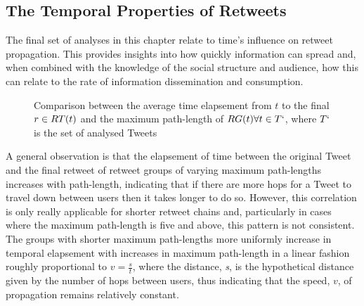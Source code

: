  
\subsection{The Temporal Properties of Retweets}
The final set of analyses in this chapter relate to time's influence on retweet propagation. This provides insights into how quickly information can spread and, when combined with the knowledge of the social structure and audience, how this can relate to the rate of information dissemination and consumption.

\begin{figure}[h]
\centering
    \caption{Comparison between the average time elapsement from $t$ to the final $r \in 
RT(t)$ and the maximum path-length of $RG(t) \forall t \in T`$, where $T`$ is the set of analysed Tweets}
\label{fig:timedelay-pathlength}
\end{figure}


A general observation is that the elapsement of time between the original Tweet and the final retweet of retweet groups of varying maximum path-lengths increases with path-length, indicating that if there are more hops for a Tweet to travel down between users then it takes longer to do so. However, this correlation is only really applicable for shorter retweet chains and, particularly in cases where the maximum path-length is five and above, this pattern is not consistent.\\
The groups with shorter maximum path-lengths more uniformly increase in temporal elapsement with increases in maximum path-length in a linear fashion roughly proportional to $ v=\frac{s}{t} $, where the distance, \textit{s}, is the hypothetical distance given by the number of hops between users, thus indicating that the speed, $v$, of propagation remains relatively constant. 

